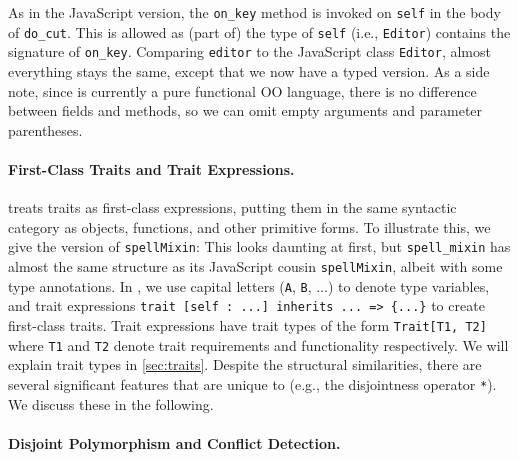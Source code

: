 As in the JavaScript version, the \lstinline{on_key} method is invoked on
\lstinline{self} in the body of \lstinline{do_cut}. This is allowed as (part of)
the type of \lstinline{self} (i.e., \lstinline{Editor}) contains the signature
of \lstinline{on_key}. Comparing \lstinline{editor} to the JavaScript class
\lstinline{Editor}, almost everything stays the same, except that we now have
a typed version. As a side note, since \sedel is currently a pure functional OO
language, there is no difference between fields and methods, so we can omit
empty arguments and parameter parentheses.

\paragraph{First-Class Traits and Trait Expressions.}

\sedel treats traits as first-class expressions, putting them in the same
syntactic category as objects, functions, and other primitive forms. To
illustrate this, we give the \sedel version of \lstinline{spellMixin}:
This looks daunting at first, but \lstinline{spell_mixin} has almost the same structure as
its JavaScript cousin \lstinline{spellMixin}, albeit with
some type annotations. In \sedel, we use capital letters (\lstinline{A}, \lstinline{B}, $\dots$) to denote type variables, and trait
expressions \lstinline$trait [self : ...] inherits ... => {...}$ to create
first-class traits. Trait expressions have trait
types of the form \lstinline{Trait[T1, T2]} where \lstinline{T1} and \lstinline{T2} denote trait requirements and functionality respectively.
We will explain trait types in \cref{sec:traits}. Despite the structural similarities, there are several significant
features that are unique to \sedel (e.g., the disjointness operator \lstinline{*}).
We discuss these in the following.



\paragraph{Disjoint Polymorphism and Conflict Detection.}

